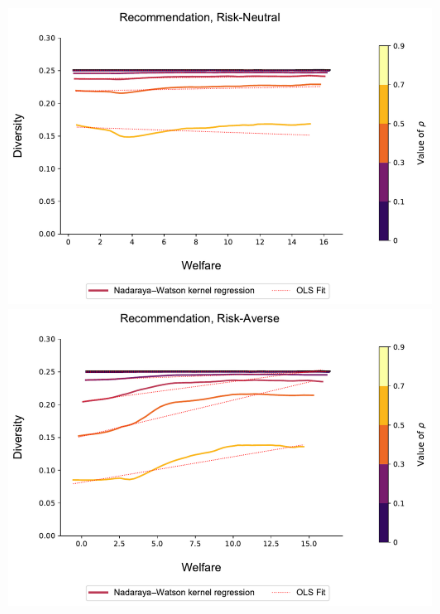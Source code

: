 \documentclass[sigconf]{acmart}
\begin{document}
\begin{figure}[t]
\includegraphics[width=1.05\linewidth]{figures/diversity_welfare_rn_partial.pdf}\\
\includegraphics[width=1.05\linewidth]{figures/diversity_welfare_ra_partial.pdf}\\
\label{fig:diversity_welfare_ra_partial}
\end{figure}
\end{document}
